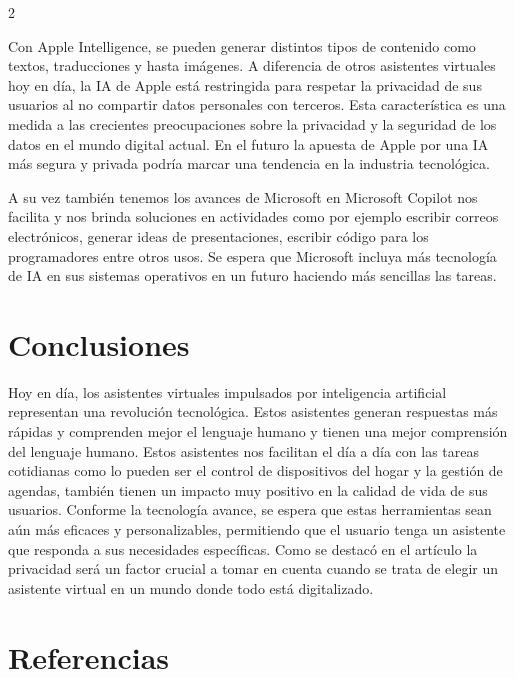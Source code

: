 \documentclass[12pt,spanish,Letterpaper,openany]{book}
\begin{document}
\begin {multicols}{2}
\bigskip
\bigskip

Con Apple Intelligence, se pueden generar distintos tipos de contenido como textos, traducciones y hasta imágenes. A diferencia de otros asistentes virtuales hoy en día, la IA de Apple está restringida para respetar la privacidad de sus usuarios al no compartir datos personales con terceros. Esta característica es una medida a las crecientes preocupaciones sobre la privacidad y la seguridad de los datos en el mundo digital actual. En el futuro la apuesta de Apple por una IA más segura y privada podría marcar una tendencia en la industria tecnológica.

A su vez también tenemos los avances de Microsoft en Microsoft Copilot nos facilita y nos brinda soluciones en actividades como por ejemplo escribir correos electrónicos, generar ideas de presentaciones, escribir código para los programadores entre otros usos. Se espera que Microsoft incluya más tecnología de IA en sus sistemas operativos en un futuro haciendo más sencillas las tareas.

\hypertarget{conclusiones-1}{%
\section{Conclusiones}\label{conclusiones-1}}

Hoy en día, los asistentes virtuales impulsados por inteligencia artificial representan una revolución tecnológica. Estos asistentes generan respuestas más rápidas y comprenden mejor el lenguaje humano y tienen una mejor comprensión del lenguaje humano. Estos asistentes nos facilitan el día a día con las tareas cotidianas como lo pueden ser el control de dispositivos del hogar y la gestión de agendas, también tienen un impacto muy positivo en la calidad de vida de sus usuarios. Conforme la tecnología avance, se espera que estas herramientas sean aún más eficaces y personalizables, permitiendo que el usuario tenga un asistente que responda a sus necesidades específicas. Como se destacó en el artículo la privacidad será un factor crucial a tomar en cuenta cuando se trata de elegir un asistente
virtual en un mundo donde todo está digitalizado.

\hypertarget{referencias-1}{%
\section{Referencias}\label{referencias-1}}


\end{multicols}
\end{document}
